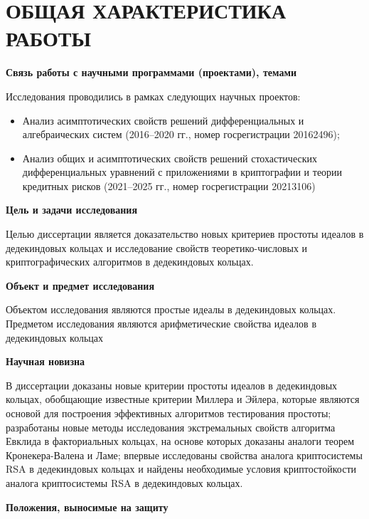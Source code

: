 \documentclass[_00_autoref.tex]{subfiles}
\begin{document}
{\let\clearpage\relax\vspace{2.2ex}
\chapter*{\MakeUppercase{ОБЩАЯ ХАРАКТЕРИСТИКА РАБОТЫ}}\vspace{-2ex}}

\medskip
\centerline{\textbf{Связь работы с научными программами (проектами), темами}}

Исследования проводились в рамках следующих научных проектов:
\begin{itemize}
    \item Анализ асимптотических свойств решений дифференциальных и алгебраических систем (2016--2020 гг., номер госрегистрации 20162496);

    \item Анализ общих и асимптотических свойств решений стохастических дифференциальных уравнений с приложениями в криптографии и теории кредитных рисков (2021--2025 гг., номер госрегистрации 20213106)
\end{itemize}

\medskip
\centerline{\textbf{Цель и задачи исследования}}

Целью диссертации является доказательство новых критериев простоты идеалов в дедекиндовых кольцах и исследование свойств теоретико-числовых и криптографических алгоритмов в дедекиндовых кольцах.

\medskip
\centerline{\textbf{Объект и предмет исследования}}

Объектом исследования являются простые идеалы в дедекиндовых кольцах.
Предметом исследования являются арифметические свойства идеалов в дедекиндовых кольцах

\medskip
\centerline{\textbf{Научная новизна}}

В диссертации доказаны новые критерии простоты идеалов в дедекиндовых кольцах, обобщающие известные критерии Миллера и Эйлера, которые являются основой для построения эффективных алгоритмов тестирования простоты; разработаны новые методы исследования экстремальных свойств алгоритма Евклида в факториальных кольцах, на основе которых доказаны аналоги теорем Кронекера-Валена и Ламе; впервые исследованы свойства аналога криптосистемы RSA в дедекиндовых кольцах и найдены необходимые условия криптостойкости аналога криптосистемы RSA в дедекиндовых кольцах.

\medskip
\centerline{\textbf{Положения, выносимые на защиту}}
\end{document}

